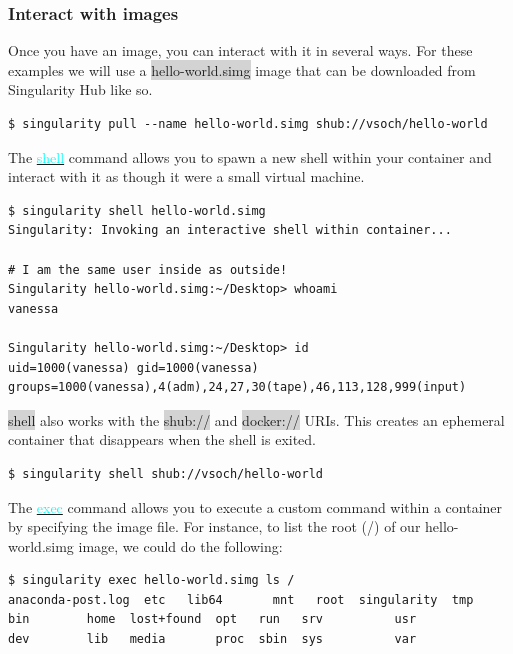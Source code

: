 \documentclass[a4paper]{article}
\newcounter{subsubsubsection}[subsubsection]
\begin{document}
\subsubsection{Interact with images}

Once you have an image, you can interact with it in several ways. For these examples we will use a \colorbox{lightgray}{hello-world.simg} image that can be downloaded from Singularity Hub like so.

\begin{lstlisting}[frame=single]  
$ singularity pull --name hello-world.simg shub://vsoch/hello-world
\end{lstlisting}


The  \hyperref[sec:shell]{{\textcolor{cyan}{shell}}} command allows you to spawn a new shell within your container and interact with it as though it were a small virtual machine.

\begin{lstlisting}[frame=single]  
$ singularity shell hello-world.simg
Singularity: Invoking an interactive shell within container...

# I am the same user inside as outside!
Singularity hello-world.simg:~/Desktop> whoami
vanessa

Singularity hello-world.simg:~/Desktop> id
uid=1000(vanessa) gid=1000(vanessa) groups=1000(vanessa),4(adm),24,27,30(tape),46,113,128,999(input)
\end{lstlisting}

\colorbox{lightgray}{shell} also works with the \colorbox{lightgray}{shub://} and \colorbox{lightgray}{docker://} URIs. This creates an ephemeral container that disappears when the shell is exited.

\begin{lstlisting}[frame=single] 
$ singularity shell shub://vsoch/hello-world
\end{lstlisting}


The \hyperref[sec:exec]{{\textcolor{cyan}{exec}}} command allows you to execute a custom command within a container by specifying the image file. For instance, to list the root (/) of our hello-world.simg image, we could do the following:\

\begin{lstlisting}[frame=single] 
$ singularity exec hello-world.simg ls /
anaconda-post.log  etc	 lib64	     mnt   root  singularity  tmp
bin		   home  lost+found  opt   run	 srv	      usr
dev		   lib	 media	     proc  sbin  sys	      var
\end{lstlisting}
\end{document}
